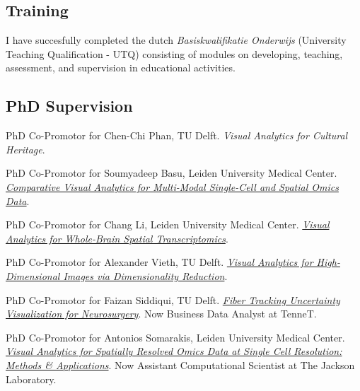 \documentclass[10pt,a4paper,roman,final]{moderncv}
\begin{document}
\subsection*{Training}
I have succesfully completed the dutch \emph{Basiskwalifikatie Onderwijs} (University Teaching Qualification - UTQ) consisting of modules on developing, teaching, assessment, and supervision in educational activities.





\subsection*{PhD Supervision}
\begin{description}[style=multiline,leftmargin=2.0cm,font=\normalfont]
\item[ongoing] PhD Co-Promotor for Chen-Chi Phan, TU Delft. \emph{Visual Analytics for Cultural Heritage}.
\item[2026] PhD Co-Promotor for Soumyadeep Basu, Leiden University Medical Center. \href{https://hdl.handle.net/1887/4310004}{\emph{Comparative Visual Analytics for Multi-Modal Single-Cell and Spatial Omics Data}}.
\item[2026] PhD Co-Promotor for Chang Li, Leiden University Medical Center. \href{https://hdl.handle.net/1887/4304746}{\emph{Visual Analytics for Whole-Brain Spatial Transcriptomics}}.
\item[2025] PhD Co-Promotor for Alexander Vieth, TU Delft. \href{https://doi.org/10.4233/uuid:0fdde46e-23cc-4984-b03b-7710a03e2b46}{\emph{Visual Analytics for High-Dimensional Images via Dimensionality Reduction}}.
\item[2025] PhD Co-Promotor for Faizan Siddiqui, TU Delft. \href{https://doi.org/10.4233/uuid:26158a6d-3f2e-4ec8-a2f1-f32fe0e4add4}{\emph{Fiber Tracking Uncertainty Visualization for Neurosurgery}}. Now Business Data Analyst at TenneT.
\item[2022] PhD Co-Promotor for Antonios Somarakis, Leiden University Medical Center. \href{https://hdl.handle.net/1887/3250550}{\emph{Visual Analytics for Spatially Resolved Omics Data at Single Cell Resolution: Methods \& Applications}}. Now Assistant Computational Scientist at The Jackson Laboratory.
\end{description}
\end{document}
